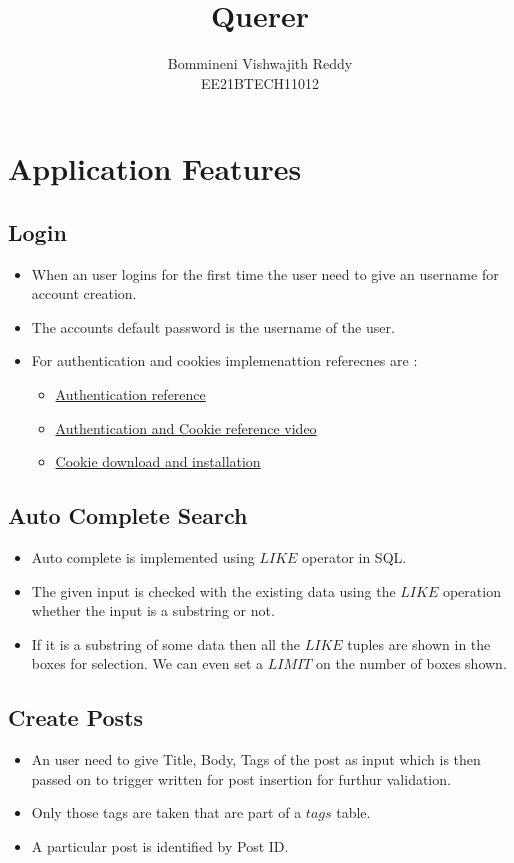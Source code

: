 \documentclass[12pt,a4paper]{article}
\title{Querer}
\author{  Bommineni Vishwajith Reddy \\ EE21BTECH11012 }
\date{}
\begin{document}
	\maketitle
	
	\tableofcontents
	\newpage
	
	\section{Application Features}
\subsection{Login}
\begin{itemize}
	\item When an user logins for the first time the user need to give an username for account creation. 
	\item The accounts default password is the username of the user.
	\item For authentication and cookies implemenattion referecnes are :
	\begin{itemize}
		\item \href{https://www.makeuseof.com/create-protected-route-in-react/#:~:text=Protected%20routes%20are%20routes%20that,securing%20certain%20routes%20or%20information}{Authentication reference}
		\item \href{https://www.youtube.com/watch?v=YPgMnugXBJo&t=794s}{Authentication and Cookie reference video}
		\item \href{https://github.com/js-cookie/js-cookie}{Cookie download and installation}
	\end{itemize}
\end{itemize}
\subsection{Auto Complete Search}
\begin{itemize}
	\item Auto complete is implemented using $LIKE$ operator in SQL.
	\item The given input is checked with the existing data using the $LIKE$ operation whether the input is a substring or not.
	\item If it is a substring of some data then all the $LIKE$ tuples are shown in the boxes for selection. We can even set a $LIMIT$ on the number of boxes shown.
\end{itemize}
\subsection{Create Posts}
\begin{itemize}
\item An user need to give Title, Body, Tags of the post as input which is then passed on to trigger written for post insertion for furthur validation.
\item Only those tags are taken that are part of a $tags$ table.
\item A particular post is identified by Post ID.
\end{itemize}
\end{document}
